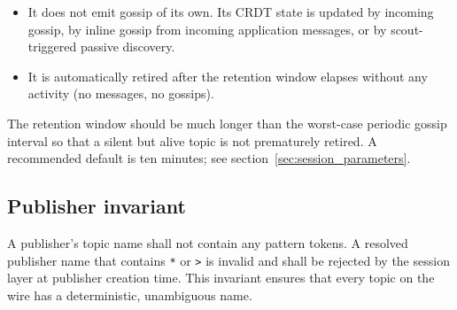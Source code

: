 \begin{itemize}
    \item It does not emit gossip of its own. Its CRDT state is updated by
    incoming gossip, by inline gossip from incoming application messages, or
    by scout-triggered passive discovery.
    \item It is automatically retired after the retention window elapses
    without any activity (no messages, no gossips).
\end{itemize}

The retention window should be much longer than the worst-case periodic
gossip interval so that a silent but alive topic is not prematurely
retired. A recommended default is ten minutes; see
section~\ref{sec:session_parameters}.

\subsection{Publisher invariant}

A publisher's topic name shall not contain any pattern tokens. A resolved
publisher name that contains \texttt{*} or \texttt{>} is invalid and shall
be rejected by the session layer at publisher creation time. This invariant
ensures that every topic on the wire has a deterministic, unambiguous name.
